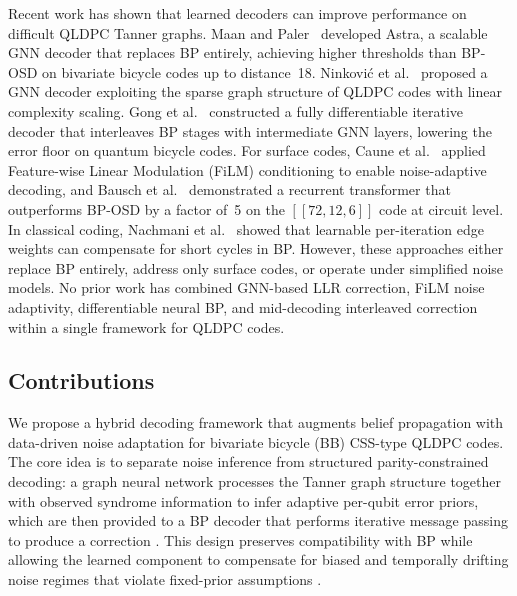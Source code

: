 \documentclass[a4paper,twocolumn,11pt,unpublished,nopdfoutputerror]{quantumarticle}
\newcommand{\code}[3]{\ensuremath{[\![#1,#2,#3]\!]}}
\begin{document}
Recent work has shown that learned decoders can improve performance on difficult QLDPC Tanner graphs. Maan and Paler~\cite{Maan2025MLBP} developed Astra, a scalable GNN decoder that replaces BP entirely, achieving higher thresholds than BP-OSD on bivariate bicycle codes up to distance~18. Ninkovi\'{c} et al.~\cite{Ninkovic2024GNN} proposed a GNN decoder exploiting the sparse graph structure of QLDPC codes with linear complexity scaling. Gong et al.~\cite{Gong2024GNN} constructed a fully differentiable iterative decoder that interleaves BP stages with intermediate GNN layers, lowering the error floor on quantum bicycle codes. For surface codes, Caune et al.~\cite{Caune2025FiLM} applied Feature-wise Linear Modulation (FiLM) conditioning to enable noise-adaptive decoding, and Bausch et al.~\cite{Bausch2025ML} demonstrated a recurrent transformer that outperforms BP-OSD by a factor of~5 on the $\code{72}{12}{6}$ code at circuit level. In classical coding, Nachmani et al.~\cite{Nachmani2016Learning,Nachmani2018Deep} showed that learnable per-iteration edge weights can compensate for short cycles in BP. However, these approaches either replace BP entirely, address only surface codes, or operate under simplified noise models. No prior work has combined GNN-based LLR correction, FiLM noise adaptivity, differentiable neural BP, and mid-decoding interleaved correction within a single framework for QLDPC codes.

\subsection{Contributions}

We propose a hybrid decoding framework that augments belief propagation with data-driven noise adaptation for bivariate bicycle (BB) CSS-type QLDPC codes. The core idea is to separate noise inference from structured parity-constrained decoding: a graph neural network processes the Tanner graph structure together with observed syndrome information to infer adaptive per-qubit error priors, which are then provided to a BP decoder that performs iterative message passing to produce a correction \cite{Roffe2020Landscape}. This design preserves compatibility with BP while allowing the learned component to compensate for biased and temporally drifting noise regimes that violate fixed-prior assumptions \cite{Tuckett2018Bias}.
\end{document}
